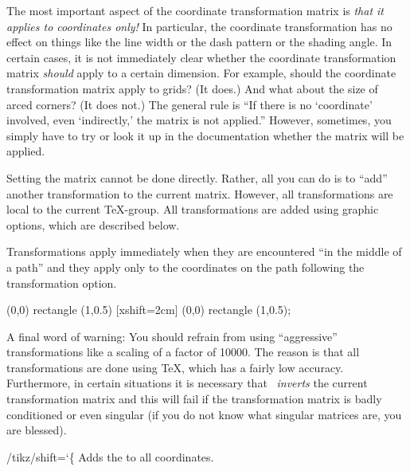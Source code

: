 The most important aspect of the coordinate transformation matrix is
\emph{that it applies to coordinates only!} In particular, the
coordinate transformation has no effect on things like the line width
or the dash pattern or the shading angle. In certain cases, it is not
immediately clear whether the coordinate transformation matrix
\emph{should} apply to a certain dimension. For example, should the
coordinate transformation matrix apply to grids? (It does.) And what
about the size of arced corners? (It does not.) The general rule is
``If there is no `coordinate' involved, even `indirectly,' the matrix
is not applied.'' However, sometimes, you simply have to try or look
it up in the documentation whether the matrix will be applied.

Setting the matrix cannot be done directly. Rather, all you can do is
to ``add'' another transformation to the current matrix. However, all
transformations are local to the current \TeX-group. All
transformations are added using graphic options, which are described
below.

Transformations apply immediately when they are encountered ``in the
middle of a path'' and they apply only to the coordinates on the path
following the transformation option. 

\begin{codeexample}[]
\tikz \draw (0,0) rectangle (1,0.5) [xshift=2cm] (0,0) rectangle (1,0.5);
\end{codeexample}

A final word of warning: You should refrain from using ``aggressive''
transformations like a scaling of a factor of 10000. The reason is
that all transformations are done using \TeX, which has a fairly low
accuracy. Furthermore, in certain situations it is necessary that
\tikzname\ \emph{inverts} the current transformation matrix and this will
fail if the transformation matrix is badly conditioned or even
singular (if you do not know what singular matrices are, you are blessed).   

\begin{key}{/tikz/shift={\ttfamily\char`\{}}
  Adds the  to all coordinates.
\begin{codeexample}[]
\end{codeexample}
\end{key}

